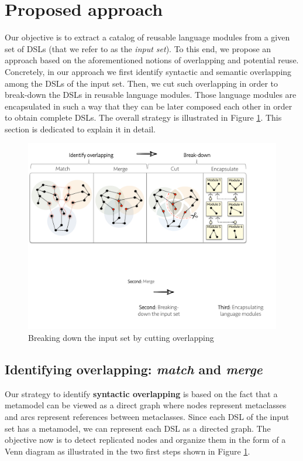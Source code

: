 \section{Proposed approach}
\label{sec:apprach}

Our objective is to extract a catalog of reusable language modules from a given set of DSLs (that we refer to as the \textit{input set}). To this end, we propose an approach based on the aforementioned notions of overlapping and potential reuse. Concretely, in our approach we first identify syntactic and semantic overlapping among the DSLs of the input set. Then, we cut such overlapping in order to break-down the DSLs in reusable language modules. Those language modules are encapsulated in such a way that they can be later composed each other in order to obtain complete DSLs. The overall strategy is illustrated in Figure \ref{fig:breakingdown}. This section is dedicated to explain it in detail.

\begin{figure}
\centering
\includegraphics[width=1\linewidth]{images/breakdown.pdf}
\caption{Breaking down the input set by cutting overlapping}
\label{fig:breakingdown}
\end{figure}

\subsection{Identifying overlapping: \textit{match} and \textit{merge}}
\label{sec:identifyingoverlapping}

Our strategy to identify \textbf{syntactic overlapping} is based on the fact that a metamodel can be viewed as a direct graph where nodes represent metaclasses and arcs represent references between metaclasses. Since each DSL of the input set has a metamodel, we can represent each DSL as a directed graph. The objective now is to detect replicated nodes and organize them in the form of a Venn diagram as illustrated in the two first steps shown in Figure \ref{fig:breakingdown}.

